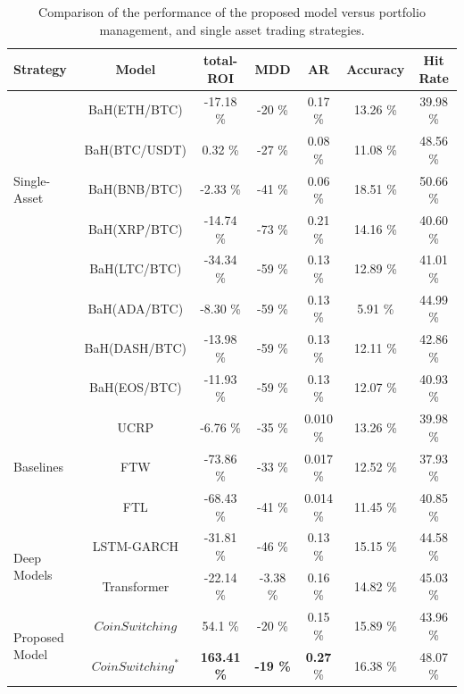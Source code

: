 \begin{table}[h]
	\centering
	\caption{Comparison of the performance of the proposed model versus portfolio management, and single asset trading strategies.}
	\label{tbl:cmp}
	\begin{tabular}{l| c | c | c | c | c | c  }
		Strategy & Model & total-ROI & MDD & AR & Accuracy & Hit Rate\\
		\hline
		\hline
		\multirow{5}{*}{Single-Asset} 	& BaH(ETH/BTC) & -17.18 \%  & -20 \% & 0.17 \% & 13.26 \% & 39.98 \% \\
										& BaH(BTC/USDT) & 0.32 \%  & -27 \% & 0.08  \% & 11.08 \% & 48.56 \% \\
										& BaH(BNB/BTC) & -2.33 \%  & -41 \% & 0.06  \% & 18.51 \% & 50.66 \% \\
										& BaH(XRP/BTC) & -14.74 \%  & -73 \% & 0.21 \% & 14.16 \% & 40.60 \% \\
										& BaH(LTC/BTC) & -34.34 \%  & -59 \% & 0.13  \% & 12.89 \% & 41.01 \% \\
										& BaH(ADA/BTC) & -8.30 \%  & -59 \% & 0.13  \% & 5.91 \% & 44.99 \% \\
										& BaH(DASH/BTC) & -13.98 \%  & -59 \% & 0.13  \% & 12.11 \% & 42.86 \% \\
										& BaH(EOS/BTC) & -11.93 \%  & -59 \% & 0.13  \% & 12.07 \% & 40.93 \% \\
		\hline
		\hline
		\multirow{3}{*}{Baselines} 	& UCRP & -6.76 \%  & -35 \% & 0.010 \% & 13.26 \% & 39.98 \% \\
												& FTW & -73.86 \%  & -33 \% & 0.017  \% & 12.52 \% & 37.93 \% \\
												& FTL & -68.43 \%  & -41 \% & 0.014  \% & 11.45 \% & 40.85 \% \\
		\hline
		\hline
		\multirow{2}{*}{Deep Models} 	& LSTM-GARCH & -31.81 \%  & -46 \% & 0.13 \% & 15.15 \% & 44.58 \% \\
									& Transformer & -22.14 \%  & -3.38 \% & 0.16  \% & 14.82 \% & 45.03 \% \\
		\hline
		\hline
		\multirow{2}{*}{Proposed Model}  	& $CoinSwitching$ &  54.1 \%  & -20 \%  & 0.15 \%& 15.89 \% & 43.96 \% \\
											& $CoinSwitching^*$ & \textbf{163.41 \%}  & \textbf{-19 \%} & \textbf{0.27}  \% & 16.38 \% & 48.07 \% \\
	\end{tabular}
\end{table}

